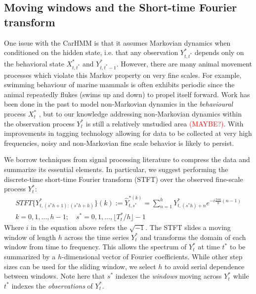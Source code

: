 

\subsection{Moving windows and the Short-time Fourier transform}
\label{subsec:STFT}

One issue with the CarHMM is that it assumes Markovian dynamics when conditioned on the hidden state, i.e. that any observation $Y^*_{t,t^*}$ depends only on the behavioral state $X^*_{t,t^*}$ and $Y^*_{t,t^*-1}$. However, there are many animal movement processes which violate this Markov property on very fine scales. For example, swimming behaviour of marine mammals is often exhibits periodic since the animal repeatedly flukes (swims up and down) to propel itself forward. Work has been done in the past to model non-Markovian dynamics in the \textit{behavioural} process $X^*_t$ \citep{Langrock:2012}, but to our knowledge addressing non-Markovian dynamics within the observation process $Y^*_t$ is still a relatively unstudied area \textcolor{red}{(MAYBE?)}. With improvements in tagging technology allowing for data to be collected at very high frequencies, noisy and non-Markovian fine scale behavior is likely to persist.

We borrow techniques from signal processing literature to compress the data and summarize its essential elements. In particular, we suggest performing the discrete-time short-time Fourier transform (STFT) over the observed fine-scale process $Y^*_t$:
%
\begin{align*}
    STFT\{Y^*_{t,(s^*h+1):(s^*h+h) }\}(k) := \hat{Y}^{*(k)}_{t,s^*} = \sum_{n = 1}^{h} Y^*_{t,(s^*h)+n}e^{-i \frac{2\pi k}{h} (n-1)} \\ k = 0, 1, \ldots, h-1; \quad s^* = 0,1, \ldots, \lfloor T^*_t / h \rfloor - 1
\end{align*}
%
Where $i$ in the equation above refers the $\sqrt{-1}$. The STFT slides a moving window of length $h$ across the time series $Y_t^*$ and transforms the domain of each window from time to frequency. This allows the spectrum of $Y_t^*$ at time $t^*$ to be summarized by a $h$-dimensional vector of Fourier coefficients. While other step sizes can be used for the sliding window, we select $h$ to avoid serial dependence between windows. Note here that $s^*$ indexes the \textit{windows} moving across $Y^*_t$ while $t^*$ indexes the \textit{observations} of $Y^*_t$. 


